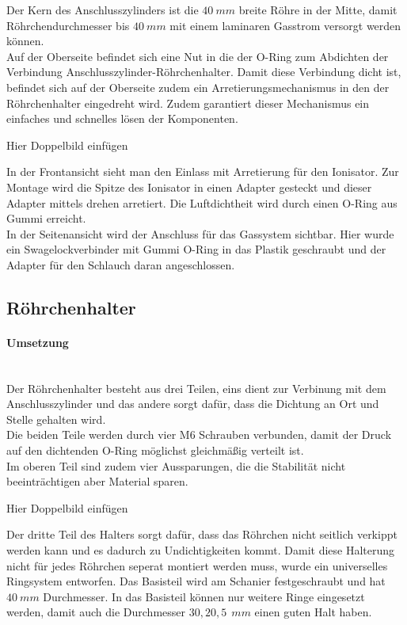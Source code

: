 Der Kern des Anschlusszylinders ist die $\SI{40}{mm}$ breite Röhre in der Mitte, damit Röhrchendurchmesser bis $\SI{40}{mm}$ mit einem laminaren Gasstrom versorgt werden können. \\
Auf der Oberseite befindet sich eine Nut in die der O-Ring zum Abdichten der Verbindung Anschlusszylinder-Röhrchenhalter. Damit diese Verbindung dicht ist, befindet sich auf der Oberseite zudem ein Arretierungsmechanismus in den der Röhrchenhalter eingedreht wird. Zudem garantiert dieser Mechanismus ein einfaches und schnelles lösen der Komponenten.


Hier Doppelbild einfügen


In der Frontansicht sieht man den Einlass mit Arretierung für den Ionisator. Zur Montage wird die Spitze des Ionisator in einen Adapter gesteckt und dieser Adapter mittels drehen arretiert. Die Luftdichtheit wird durch einen O-Ring aus Gummi erreicht. \\
In der Seitenansicht wird der Anschluss für das Gassystem sichtbar. Hier wurde ein Swagelockverbinder mit Gummi O-Ring in das Plastik geschraubt und der Adapter für den Schlauch daran angeschlossen.


\subsection{Röhrchenhalter}

\paragraph{Umsetzung}

\hfill \\

Der Röhrchenhalter besteht aus drei Teilen, eins dient zur Verbinung mit dem Anschlusszylinder und das andere sorgt dafür, dass die Dichtung an Ort und Stelle gehalten wird. \\
Die beiden Teile werden durch vier M6 Schrauben verbunden, damit der Druck auf den dichtenden O-Ring möglichst gleichmäßig verteilt ist. \\
Im oberen Teil sind zudem vier Aussparungen, die die Stabilität nicht beeinträchtigen aber Material sparen. 

Hier Doppelbild einfügen


Der dritte Teil des Halters sorgt dafür, dass das Röhrchen nicht seitlich verkippt werden kann und es dadurch zu Undichtigkeiten kommt. Damit diese Halterung nicht für jedes Röhrchen seperat montiert werden muss, wurde ein universelles Ringsystem entworfen. Das Basisteil wird am Schanier festgeschraubt und hat $\SI{40}{mm}$ Durchmesser. In das Basisteil können nur weitere Ringe eingesetzt werden, damit auch die Durchmesser $30,20,5\SI{}{\ mm}$ einen guten Halt haben.


